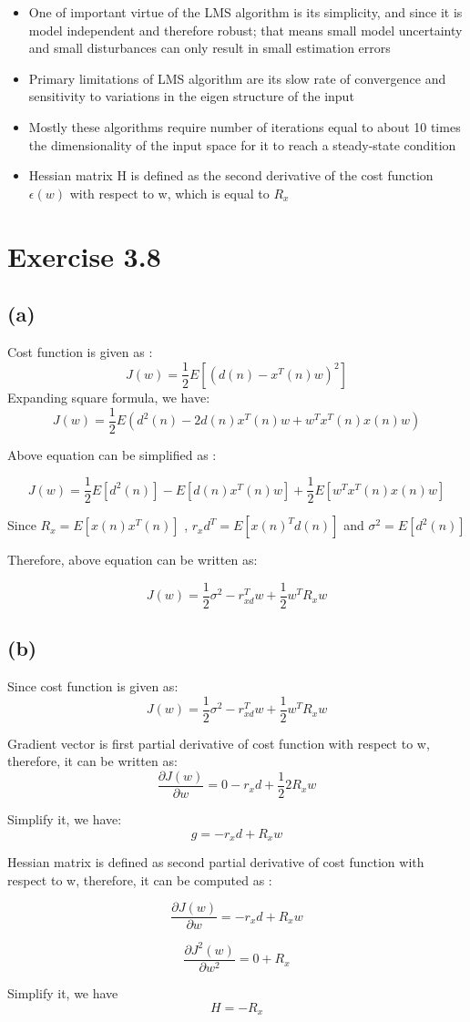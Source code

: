 \documentclass[12pt]{article}
\begin{document}
\begin{itemize}
	\item One of important virtue of the LMS algorithm is its simplicity, and since it is model independent and therefore robust; that means small model uncertainty and small disturbances can only result in small estimation errors
	\item Primary limitations of LMS algorithm are its slow rate of convergence and sensitivity to variations in the eigen structure of the input
	\item Mostly these algorithms require number of iterations equal to about 10 times the dimensionality of the input space for it to reach a steady-state condition
	\item Hessian matrix H is defined as the second derivative of the cost function $\epsilon(w)$ with respect to w, which is equal to $R_x$
\end{itemize}

\section{ Exercise 3.8}
\subsection{(a)} 
Cost function is given as : $$ J(w) = \frac{1}{2} E[(d(n) - x^T(n)w )^2 ]$$ 
Expanding square formula, we have: $$ J(w) = \frac{1}{2} E( d^2(n) - 2d(n) x^T(n) w  + w^T x^T(n) x(n) w ) $$ 

Above equation can be simplified as : 

$$ J(w) = \frac{1}{2} E[d^2(n)] - E[d(n) x^T(n) w ] + \frac{1}{2} E[w^T x^T(n) x(n) w]    $$

Since $ R_x = E[x(n) x^T(n)] $ , $r_xd^T = E[x(n)^T d(n)]$ and $ \sigma^2 = E[d^2(n)] $ 

Therefore, above equation can be written as:

$$ J(w) = \frac{1}{2} \sigma^2 - r_{xd}^T w + \frac{1}{2} w^T R_x w $$


\subsection{(b)}

Since cost function is given as: $$ J(w) = \frac{1}{2} \sigma^2 - r_{xd}^T w + \frac{1}{2} w^T R_x w $$

Gradient vector is first partial derivative of cost function with respect to w, therefore, it can be written as: 
	$$ \frac{\partial J(w)}{\partial w} = 0 - r_xd + \frac{1}{2} 2 R_x w $$

Simplify it, we have: $$ g = -r_xd + R_xw $$ 

Hessian matrix is defined as second partial derivative of cost function with respect to w, therefore, it can be computed as :

	$$ \frac{\partial J(w)}{\partial w} = -r_xd + R_xw  $$

		$$ \frac{\partial J^2(w)}{\partial w^2} = 0 + R_x $$
		
Simplify it, we have $$H = -R_x $$
\end{document}
